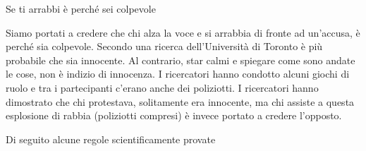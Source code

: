 \documentclass[12pt]{book} %
\begin{document}
\bigskip
\begin{mdframed}[linewidth=1pt]
Se ti arrabbi è perché sei colpevole

Siamo portati a credere che chi alza la voce e si arrabbia di fronte ad un'accusa, è perché sia
colpevole. Secondo una ricerca dell'Università di Toronto è più probabile che sia innocente. Al contrario, star calmi e
spiegare come sono andate le cose, non è indizio di innocenza. I ricercatori hanno condotto alcuni giochi di ruolo e
tra i partecipanti c'erano anche dei poliziotti. I ricercatori hanno dimostrato che chi
protestava, solitamente era innocente, ma chi assiste a questa esplosione di rabbia (poliziotti compresi) è invece
portato a credere l'opposto. 
\end{mdframed}

\bigskip

Di seguito alcune regole scientificamente
provate
\end{document}
